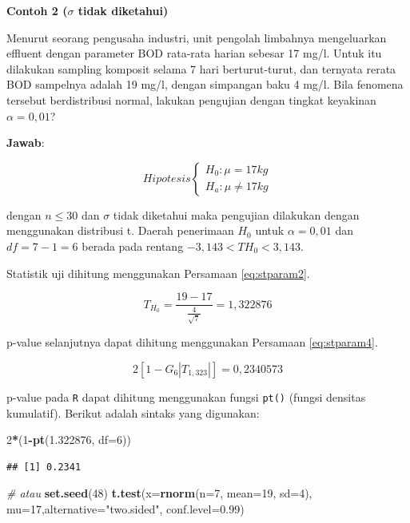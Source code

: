 \documentclass[]{book}
\newenvironment{Shaded}{\begin{snugshade}}{\end{snugshade}}
\newcommand{\KeywordTok}[1]{\textcolor[rgb]{0.13,0.29,0.53}{\textbf{#1}}}
\newcommand{\DataTypeTok}[1]{\textcolor[rgb]{0.13,0.29,0.53}{#1}}
\newcommand{\DecValTok}[1]{\textcolor[rgb]{0.00,0.00,0.81}{#1}}
\newcommand{\FloatTok}[1]{\textcolor[rgb]{0.00,0.00,0.81}{#1}}
\newcommand{\StringTok}[1]{\textcolor[rgb]{0.31,0.60,0.02}{#1}}
\newcommand{\CommentTok}[1]{\textcolor[rgb]{0.56,0.35,0.01}{\textit{#1}}}
\newcommand{\OperatorTok}[1]{\textcolor[rgb]{0.81,0.36,0.00}{\textbf{#1}}}
\newcommand{\NormalTok}[1]{#1}
\begin{document}
\textbf{Contoh 2 (\(\sigma\) tidak diketahui)}

Menurut seorang pengusaha industri, unit pengolah limbahnya mengeluarkan
effluent dengan parameter BOD rata-rata harian sebesar 17 mg/l. Untuk
itu dilakukan sampling komposit selama 7 hari berturut-turut, dan
ternyata rerata BOD sampelnya adalah 19 mg/l, dengan simpangan baku 4
mg/l. Bila fenomena tersebut berdistribusi normal, lakukan pengujian
dengan tingkat keyakinan \(\alpha=0,01\)?

\textbf{Jawab}:

\[
Hipotesis
  \begin{cases}
    H_0:\mu=17kg\\
    H_a:\mu\ne17kg
    \end{cases}
\]

dengan \(n\le30\) dan \(\sigma\) tidak diketahui maka pengujian
dilakukan dengan menggunakan distribusi t. Daerah penerimaan \(H_0\)
untuk \(\alpha=0,01\) dan \(df=7-1=6\) berada pada rentang
\(-3,143<T{H_0}<3,143\).

Statistik uji dihitung menggunakan Persamaan \eqref{eq:stparam2}.

\[
T_{H_0}=\frac{19-17}{\frac{4}{\sqrt{7}}}=1,322876
\]

p-value selanjutnya dapat dihitung menggunakan Persamaan
\eqref{eq:stparam4}.

\[
2\left[1-G_{6}\left|T_{1,323}\right|\right]=0,2340573
\]

p-value pada \texttt{R} dapat dihitung menggunakan fungsi \texttt{pt()}
(fungsi densitas kumulatif). Berikut adalah sintaks yang digunakan:

\begin{Shaded}
\begin{Highlighting}[]
\DecValTok{2}\OperatorTok{*}\NormalTok{(}\DecValTok{1}\OperatorTok{-}\KeywordTok{pt}\NormalTok{(}\FloatTok{1.322876}\NormalTok{, }\DataTypeTok{df=}\DecValTok{6}\NormalTok{))}
\end{Highlighting}
\end{Shaded}

\begin{verbatim}
## [1] 0.2341
\end{verbatim}

\begin{Shaded}
\begin{Highlighting}[]
\CommentTok{# atau}
\KeywordTok{set.seed}\NormalTok{(}\DecValTok{48}\NormalTok{)}
\KeywordTok{t.test}\NormalTok{(}\DataTypeTok{x=}\KeywordTok{rnorm}\NormalTok{(}\DataTypeTok{n=}\DecValTok{7}\NormalTok{, }\DataTypeTok{mean=}\DecValTok{19}\NormalTok{, }\DataTypeTok{sd=}\DecValTok{4}\NormalTok{), }
       \DataTypeTok{mu=}\DecValTok{17}\NormalTok{,}\DataTypeTok{alternative=}\StringTok{"two.sided"}\NormalTok{,}
       \DataTypeTok{conf.level=}\FloatTok{0.99}\NormalTok{)}
\end{Highlighting}
\end{Shaded}
\end{document}
